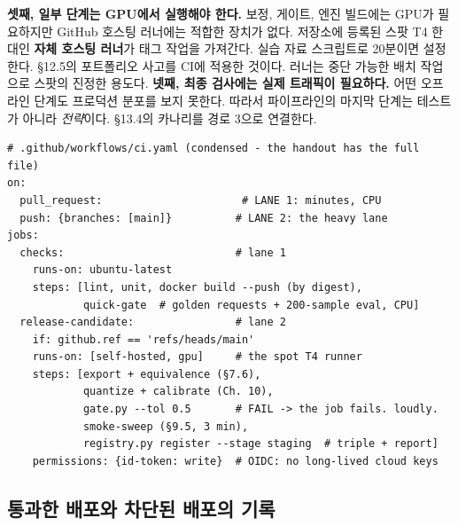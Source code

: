 \textbf{셋째, 일부 단계는 GPU에서 실행해야 한다.} 보정, 게이트, 엔진 빌드에는 GPU가 필요하지만 GitHub 호스팅 러너에는 적합한 장치가 없다. 저장소에 등록된 스팟 T4 한 대인 \textbf{자체 호스팅 러너}가  태그 작업을 가져간다. 실습 자료 스크립트로 20분이면 설정한다. §12.5의 포트폴리오 사고를 CI에 적용한 것이다. 러너는 중단 가능한 배치 작업으로 스팟의 진정한 용도다. \textbf{넷째, 최종 검사에는 실제 트래픽이 필요하다.} 어떤 오프라인 단계도 프로덕션 분포를 보지 못한다. 따라서 파이프라인의 마지막 단계는 테스트가 아니라 \textit{전략}이다. §13.4의 카나리를 경로 3으로 연결한다.

\begin{terminalbox}
\begin{Verbatim}[breaklines=true,breakanywhere=true,fontsize=\small,formatcom=\color{tbbtermfg},codes=\tbbcodeactive]
# .github/workflows/ci.yaml (condensed - the handout has the full file)
on:
  pull_request:                      # LANE 1: minutes, CPU
  push: {branches: [main]}          # LANE 2: the heavy lane
jobs:
  checks:                           # lane 1
    runs-on: ubuntu-latest
    steps: [lint, unit, docker build --push (by digest),
            quick-gate  # golden requests + 200-sample eval, CPU]
  release-candidate:                # lane 2
    if: github.ref == 'refs/heads/main'
    runs-on: [self-hosted, gpu]     # the spot T4 runner
    steps: [export + equivalence (§7.6),
            quantize + calibrate (Ch. 10),
            gate.py --tol 0.5       # FAIL -> the job fails. loudly.
            smoke-sweep (§9.5, 3 min),
            registry.py register --stage staging  # triple + report]
    permissions: {id-token: write}  # OIDC: no long-lived cloud keys
\end{Verbatim}
\end{terminalbox}

\subsection*{통과한 배포와 차단된 배포의 기록}

